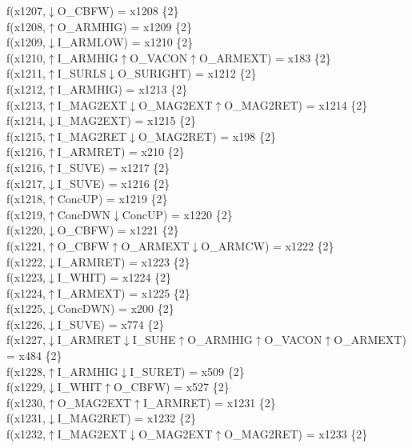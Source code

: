 f(x1207,$\downarrow$O\_CBFW) = x1208 \{2\} \\  
f(x1208,$\uparrow$O\_ARMHIG) = x1209 \{2\} \\  
f(x1209,$\downarrow$I\_ARMLOW) = x1210 \{2\} \\  
f(x1210,$\uparrow$I\_ARMHIG$\uparrow$O\_VACON$\uparrow$O\_ARMEXT) = x183 \{2\} \\  
f(x1211,$\uparrow$I\_SURLS$\downarrow$O\_SURIGHT) = x1212 \{2\} \\  
f(x1212,$\uparrow$I\_ARMHIG) = x1213 \{2\} \\  
f(x1213,$\uparrow$I\_MAG2EXT$\downarrow$O\_MAG2EXT$\uparrow$O\_MAG2RET) = x1214 \{2\} \\  
f(x1214,$\downarrow$I\_MAG2EXT) = x1215 \{2\} \\  
f(x1215,$\uparrow$I\_MAG2RET$\downarrow$O\_MAG2RET) = x198 \{2\} \\  
f(x1216,$\uparrow$I\_ARMRET) = x210 \{2\} \\  
f(x1216,$\uparrow$I\_SUVE) = x1217 \{2\} \\  
f(x1217,$\downarrow$I\_SUVE) = x1216 \{2\} \\  
f(x1218,$\uparrow$ConcUP) = x1219 \{2\} \\  
f(x1219,$\uparrow$ConcDWN$\downarrow$ConcUP) = x1220 \{2\} \\  
f(x1220,$\downarrow$O\_CBFW) = x1221 \{2\} \\  
f(x1221,$\uparrow$O\_CBFW$\uparrow$O\_ARMEXT$\downarrow$O\_ARMCW) = x1222 \{2\} \\  
f(x1222,$\downarrow$I\_ARMRET) = x1223 \{2\} \\  
f(x1223,$\downarrow$I\_WHIT) = x1224 \{2\} \\  
f(x1224,$\uparrow$I\_ARMEXT) = x1225 \{2\} \\  
f(x1225,$\downarrow$ConcDWN) = x200 \{2\} \\  
f(x1226,$\downarrow$I\_SUVE) = x774 \{2\} \\  
f(x1227,$\downarrow$I\_ARMRET$\downarrow$I\_SUHE$\uparrow$O\_ARMHIG$\uparrow$O\_VACON$\uparrow$O\_ARMEXT) = x484 \{2\} \\  
f(x1228,$\uparrow$I\_ARMHIG$\downarrow$I\_SURET) = x509 \{2\} \\  
f(x1229,$\downarrow$I\_WHIT$\uparrow$O\_CBFW) = x527 \{2\} \\  
f(x1230,$\uparrow$O\_MAG2EXT$\uparrow$I\_ARMRET) = x1231 \{2\} \\  
f(x1231,$\downarrow$I\_MAG2RET) = x1232 \{2\} \\  
f(x1232,$\uparrow$I\_MAG2EXT$\downarrow$O\_MAG2EXT$\uparrow$O\_MAG2RET) = x1233 \{2\} \\  
